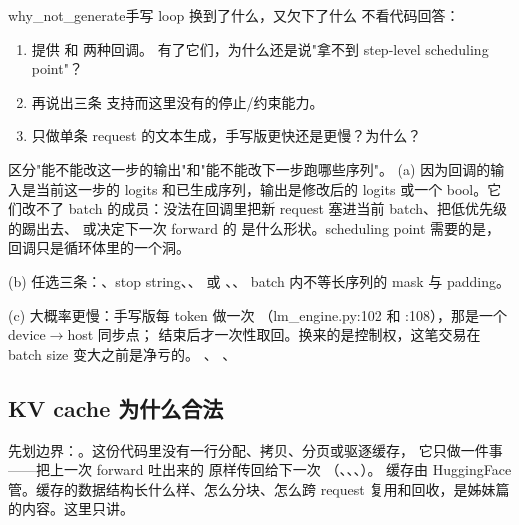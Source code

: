 \begin{checkpoint}{why_not_generate}{手写 loop 换到了什么，又欠下了什么}
不看代码回答：
\begin{enumerate}[label=(\alph*)]
  \item {} 提供  和  两种回调。
        有了它们，为什么还是说"拿不到 step-level scheduling point"？
  \item 再说出三条  支持而这里没有的停止/约束能力。
  \item 只做单条 request 的文本生成，手写版更快还是更慢？为什么？
\end{enumerate}
\hint 区分"能不能改这一步的输出"和"能不能改下一步跑哪些序列"。
\ifshowanswers
\tcblower
\answer (a) 因为回调的输入是当前这一步的 logits 和已生成序列，输出是修改后的 logits 或一个
bool。它们改不了 batch 的成员：没法在回调里把新 request 塞进当前 batch、把低优先级的踢出去、
或决定下一次 forward 的  是什么形状。scheduling point 需要的是，回调只是循环体里的一个洞。

(b) 任选三条：、stop string、、
 或 、、
batch 内不等长序列的 mask 与 padding。

(c) 大概率更慢：手写版每 token 做一次 （lm\_engine.py:102 和 :108），那是一个
device$\to$host 同步点； 结束后才一次性取回。换来的是控制权，这笔交易在
batch size 变大之前是净亏的。
\whereincode {}、
、
\fi
\end{checkpoint}

\subsection{KV cache 为什么合法}
\label{sec:a-loop-kv-legality}

先划边界：。这份代码里没有一行分配、拷贝、分页或驱逐缓存，
它只做一件事——把上一次 forward 吐出来的  原样传回给下一次
（、、、）。
缓存由 HuggingFace 管。缓存的数据结构长什么样、怎么分块、怎么跨 request 复用和回收，是姊妹篇
的内容。这里只讲。


